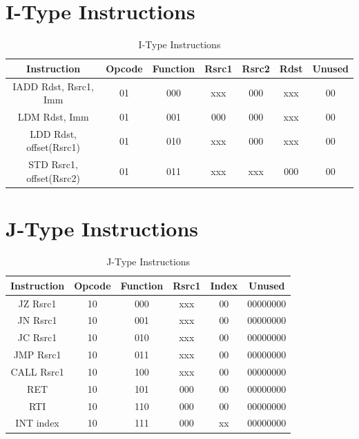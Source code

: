\documentclass{report}
\begin{document}
\section*{I-Type Instructions}
\begin{table}[H]
    \centering
    \begin{tabular}{|c|c|c|c|c|c|c|}
    \hline
    \textbf{Instruction} & \textbf{Opcode} & \textbf{Function} & \textbf{Rsrc1} & \textbf{Rsrc2} & \textbf{Rdst} & \textbf{Unused} \\ \hline
    IADD Rdst, Rsrc1, Imm & 01 & 000 & xxx & \cellcolor{red!20}000 & xxx & \cellcolor{red!20}00 \\ \hline
    LDM Rdst, Imm & 01 & 001 & 000 & \cellcolor{red!20}000 & xxx & \cellcolor{red!20}00 \\ \hline
    LDD Rdst, offset(Rsrc1) & 01 & 010 & xxx & \cellcolor{red!20}000 & xxx & \cellcolor{red!20}00 \\ \hline
    STD Rsrc1, offset(Rsrc2) & 01 & 011 & xxx & xxx & \cellcolor{red!20}000 & \cellcolor{red!20}00 \\ \hline
    \end{tabular}
    \caption{I-Type Instructions}
    \label{tab:i-type}
\end{table}

\section*{J-Type Instructions}
\begin{table}[H]
    \centering
    \begin{tabular}{|c|c|c|c|c|c|}
    \hline
    \textbf{Instruction} & \textbf{Opcode} & \textbf{Function} & \textbf{Rsrc1} & \textbf{Index} & \textbf{Unused} \\ \hline
    JZ Rsrc1 & 10 & 000 & xxx & \cellcolor{red!20}00 & \cellcolor{red!20}00000000 \\ \hline
    JN Rsrc1 & 10 & 001 & xxx & \cellcolor{red!20}00 & \cellcolor{red!20}00000000 \\ \hline
    JC Rsrc1 & 10 & 010 & xxx & \cellcolor{red!20}00 & \cellcolor{red!20}00000000 \\ \hline
    JMP Rsrc1 & 10 & 011 & xxx & \cellcolor{red!20}00 & \cellcolor{red!20}00000000 \\ \hline
    CALL Rsrc1 & 10 & 100 & xxx & \cellcolor{red!20}00 & \cellcolor{red!20}00000000 \\ \hline
    RET & 10 & 101 & \cellcolor{red!20}000 & \cellcolor{red!20}00 & \cellcolor{red!20}00000000 \\ \hline
    RTI & 10 & 110 & \cellcolor{red!20}000 & \cellcolor{red!20}00 & \cellcolor{red!20}00000000 \\ \hline
    INT index & 10 & 111 & \cellcolor{red!20}000 & xx & \cellcolor{red!20}00000000 \\ \hline
    \end{tabular}
    \caption{J-Type Instructions}
    \label{tab:j-type}
\end{table}
\end{document}
